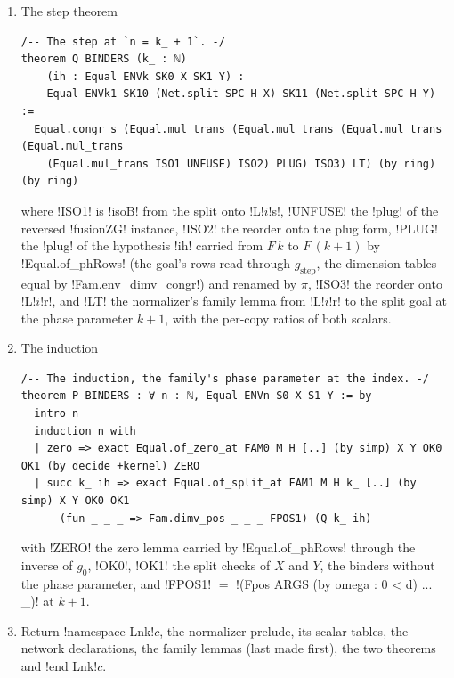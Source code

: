 {\begin{algorithm}
\begin{enumerate}
  $\pi$ maps $o \mapsto w$ and every summed label of $Y_s$ to a fresh label
  (\py!_perm_to_bijection!).
\item The step theorem
\begin{lstlisting}[style=grammar]
/-- The step at `n = k_ + 1`. -/
theorem Q BINDERS (k_ : ℕ)
    (ih : Equal ENVk SK0 X SK1 Y) :
    Equal ENVk1 SK10 (Net.split SPC H X) SK11 (Net.split SPC H Y) :=
  Equal.congr_s (Equal.mul_trans (Equal.mul_trans (Equal.mul_trans (Equal.mul_trans
    (Equal.mul_trans ISO1 UNFUSE) ISO2) PLUG) ISO3) LT) (by ring) (by ring)
\end{lstlisting}
  where \code!ISO1! is \lean!isoB! from the split onto \code!L!$i$\code!s!, \code!UNFUSE! the
  \code!plug! of the reversed \lean!fusionZG! instance, \code!ISO2! the reorder onto the plug form,
  \code!PLUG! the \code!plug! of the hypothesis \code!ih! carried from $F\,k$ to $F\,(k+1)$ by
  \lean!Equal.of_phRows! (the goal's rows read through $g_{\mathrm{step}}$, the dimension tables
  equal by \lean!Fam.env_dimv_congr!) and renamed by $\pi$, \code!ISO3! the reorder onto
  \code!L!$i$\code!r!, and \code!LT! the normalizer's family lemma from \code!L!$i$\code!r! to the
  split goal at the phase parameter $k+1$, with the per-copy ratios of both scalars.
\item The induction
\begin{lstlisting}[style=grammar]
/-- The induction, the family's phase parameter at the index. -/
theorem P BINDERS : ∀ n : ℕ, Equal ENVn S0 X S1 Y := by
  intro n
  induction n with
  | zero => exact Equal.of_zero_at FAM0 M H [..] (by simp) X Y OK0 OK1 (by decide +kernel) ZERO
  | succ k_ ih => exact Equal.of_split_at FAM1 M H k_ [..] (by simp) X Y OK0 OK1
      (fun _ _ _ => Fam.dimv_pos _ _ _ FPOS1) (Q k_ ih)
\end{lstlisting}
  with \code!ZERO! the zero lemma carried by \lean!Equal.of_phRows! through the inverse of $g_0$,
  \code!OK0!, \code!OK1! the split checks of $X$ and $Y$, the binders without the phase
  parameter, and \code!FPOS1! $=$ \code!(Fpos ARGS (by omega : 0 < d) ... _)! at $k+1$.
\item Return \code!namespace Lnk!$c$, the normalizer prelude, its scalar tables, the network
  declarations, the family lemmas (last made first), the two theorems and \code!end Lnk!$c$.
\end{enumerate}
\end{algorithm}

}
